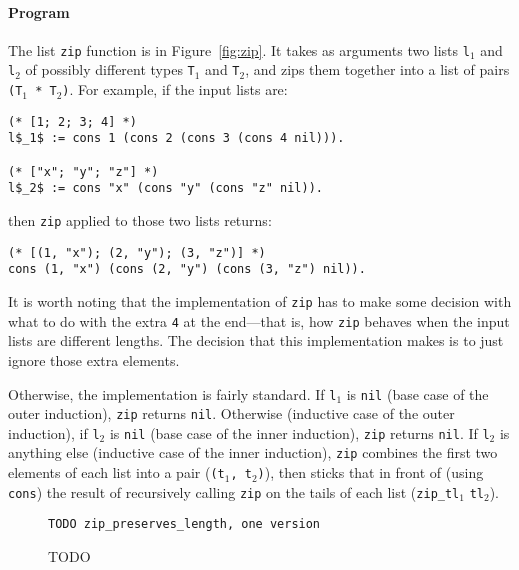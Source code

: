 \paragraph{Program} The list \lstinline{zip} function is in Figure~\ref{fig:zip}.
It takes as arguments two lists \lstinline{l}$_1$ and \lstinline{l}$_2$ of possibly different types \lstinline{T}$_1$ and \lstinline{T}$_2$, and zips them together into
a list of pairs \lstinline{(T}$_1$\lstinline{ * T}$_2$\lstinline{)}.
For example, if the input lists are: %

\begin{lstlisting}
(* [1; 2; 3; 4] *)
l$_1$ := cons 1 (cons 2 (cons 3 (cons 4 nil))).

(* ["x"; "y"; "z"] *)
l$_2$ := cons "x" (cons "y" (cons "z" nil)).
\end{lstlisting}
then \lstinline{zip} applied to those two lists returns:

\begin{lstlisting}
(* [(1, "x"); (2, "y"); (3, "z")] *)
cons (1, "x") (cons (2, "y") (cons (3, "z") nil)).
\end{lstlisting}
It is worth noting that the implementation of \lstinline{zip} has to make some decision with
what to do with the extra \lstinline{4} at the end---that is, how \lstinline{zip} behaves when the input
lists are different lengths.
The decision that this implementation makes is to just ignore those extra elements.

Otherwise, the implementation is fairly standard.
If \lstinline{l}$_1$ is \lstinline{nil} (base case of the outer induction),
\lstinline{zip} returns \lstinline{nil}.
Otherwise (inductive case of the outer induction),
if \lstinline{l}$_2$ is \lstinline{nil} (base case of the inner induction),
\lstinline{zip} returns \lstinline{nil}.
If \lstinline{l}$_2$ is anything else (inductive case of the inner induction),
\lstinline{zip} combines the first two elements of each list into a pair (\lstinline{(t}$_1$\lstinline{, t}$_2$\lstinline{)}),
then sticks that in front of (using \lstinline{cons}) the result of recursively calling \lstinline{zip} on the tails of each list
(\lstinline{zip_tl}$_1$ \lstinline{tl}$_2$). %

\begin{figure}
\begin{lstlisting}
TODO zip_preserves_length, one version
\end{lstlisting}
\caption{TODO}
\label{fig:zip-pres}
\end{figure}

